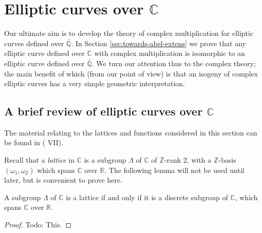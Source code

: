 \newpage
\section{Elliptic curves over $\mathbb{C}$}
\label{sec:compl-mult-over-C}

Our ultimate aim is to develop the theory of complex multiplication for elliptic
curves defined over $\mathbb{\bar{Q}}$.  In Section \ref{sec:towards-abel-extens} we
prove that any elliptic curve defined over $\mathbb{C}$ with complex
multiplication is isomorphic to an elliptic curve defined over $\mathbb{\bar{Q}}$.
We turn our attention thus to the complex theory; the main benefit of which (from our
point of view) is that an isogeny of complex elliptic curves has a very simple
geometric interpretation.

\subsection{A brief review of elliptic curves over $\mathbb{C}$}
\label{sec:review-complex-curves}



The material relating to the lattices and functions considered in this section can be
found in (\cite{serre73} VII).

Recall that a \emph{lattice} in $\mathbb{C}$ is a subgroup $\Lambda$ of $\mathbb{C}$ of
$\mathbb{Z}$-rank $2$, with a $\mathbb{Z}$-basis $(\omega_{1},\omega_{2})$ which
spans $\mathbb{C}$ over $\mathbb{R}$.  The following lemma will not be used until
later, but is convenient to prove here.

\begin{lem}
  \label{lem:latice-iff-discrete}
  A subgroup $\Lambda$ of $\mathbb{C}$ is a lattice if and only if it is a discrete
  subgroup of $\mathbb{C}$, which spans $\mathbb{C}$ over $\mathbb{R}$.
\end{lem}
\begin{proof}
  Todo: This.
\end{proof}

